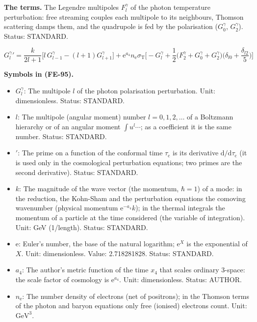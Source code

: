 \documentclass[
  10pt,
]{article}
\providecommand{\tightlist}{%
  \setlength{\itemsep}{0pt}\setlength{\parskip}{0pt}}
\begin{document}
\textbf{The terms.} The Legendre multipoles \(F^\gamma_l\) of the photon
temperature perturbation: free streaming couples each multipole to its
neighbours, Thomson scattering damps them, and the quadrupole is fed by
the polarisation (\(G^\gamma_0\), \(G^\gamma_2\)). Status: STANDARD.

\[
G^\gamma_l{}' = \frac{k}{2l + 1}\big[l\,G^\gamma_{l-1} - (l + 1)G^\gamma_{l+1}\big]
 + \mathrm{e}^{a_4}n_{\mathrm{e}}\sigma_{\mathrm{T}}\Big[-G^\gamma_l + \frac12\big(F^\gamma_2 +
 G^\gamma_0 + G^\gamma_2\big)
 \Big(\delta_{l0} + \frac{\delta_{l2}}{5}\Big)\Big] \tag{FE-95}
\]

\textbf{Symbols in (FE-95).}

\begin{itemize}
\tightlist
\item
  \(G^\gamma_l\): The multipole \(l\) of the photon polarisation
  perturbation. Unit: dimensionless. Status: STANDARD.
\item
  \(l\): The multipole (angular moment) number \(l = 0, 1, 2, \dots\) of
  a Boltzmann hierarchy or of an angular moment \(\int u^l\cdots\); as a
  coefficient it is the same number. Status: STANDARD.
\item
  \({}'\): The prime on a function of the conformal time
  \(\tau_{\mathrm{c}}\) is its derivative
  \(\mathrm{d}/\mathrm{d}\tau_{\mathrm{c}}\) (it is used only in the
  cosmological perturbation equations; two primes are the second
  derivative). Status: STANDARD.
\item
  \(k\): The magnitude of the wave vector (the momentum, \(\hbar = 1\))
  of a mode: in the reduction, the Kohn-Sham and the perturbation
  equations the comoving wavenumber (physical momentum
  \(\mathrm{e}^{-a_4}k\)); in the thermal integrals the momentum of a
  particle at the time considered (the variable of integration). Unit:
  GeV (1/length). Status: STANDARD.
\item
  \(\mathrm{e}\): Euler's number, the base of the natural logarithm;
  \(\mathrm{e}^{X}\) is the exponential of \(X\). Unit: dimensionless.
  Value: 2.718281828. Status: STANDARD.
\item
  \(a_4\): The author's metric function of the time \(x_4\) that scales
  ordinary 3-space: the scale factor of cosmology is
  \(\mathrm{e}^{a_4}\). Unit: dimensionless. Status: AUTHOR.
\item
  \(n_{\mathrm{e}}\): The number density of electrons (net of
  positrons); in the Thomson terms of the photon and baryon equations
  only free (ionised) electrons count. Unit: \(\mathrm{GeV}^{3}\).

\end{itemize}
\end{document}
